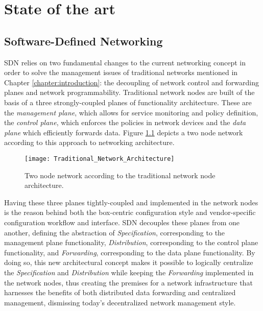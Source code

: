 
\chapter{State of the art}
\label{chapter:state-of-the-art}
%
\section{Software-Defined Networking}
\label{section:software-defined-network}
\gls{SDN} relies on two fundamental changes to the current networking concept in order to solve the management issues of traditional networks mentioned in Chapter \ref{chapter:introduction}: the decoupling of network control and forwarding planes and network programmability\cite{OFWP}.
% 
Traditional network nodes are built of the basis of a three strongly-coupled planes of functionality architecture.
These are the \emph{management plane}, which allows for service monitoring and policy definition, the \emph{control plane}, which enforces the policies in network devices and the \emph{data plane} which efficiently forwards data.
Figure \ref{fig:Traditional_Network_Architecture} depicts a two node network according to this approach to networking architecture.\\
\begin{figure}
	\centering
	\texttt{[image: Traditional\_Network\_Architecture]}
	\caption{Two node network according to the traditional network node architecture.}
	\label{fig:Traditional_Network_Architecture}
\end{figure}
%
Having these three planes tightly-coupled and implemented in the network nodes is the reason behind both the box-centric configuration style and vendor-specific configuration workflow and interface.
\gls{SDN} decouples these planes from one another, defining the abstraction of \emph{Specification}, corresponding to the management plane functionality, \emph{Distribution}, corresponding to the control plane functionality, and \emph{Forwarding}, corresponding to the data plane functionality.
By doing so, this new architectural concept makes it possible to logically centralize the \emph{Specification} and \emph{Distribution} while keeping the \emph{Forwarding} implemented in the network nodes\cite{Kreutz2014}\cite{OFWP},\cite{OpenNetworkingFoundation} thus creating the premises for a network infrastructure that harnesses the benefits of both distributed data forwarding and centralized management, dismissing today's decentralized network management style.\\
